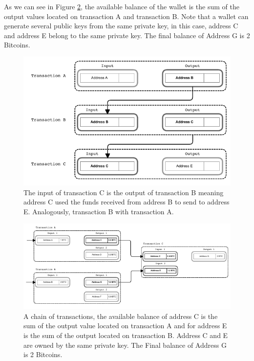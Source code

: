 \documentclass[../../thesis.tex]{subfiles}
\begin{document}
 As we can see in Figure \ref{fig:transactions2}, the available balance of the wallet is the sum of the output values located on transaction A and transaction B. Note that a wallet can generate several public keys from the same private key, in this case, address C and address E belong to the same private key. The final balance of Address G is 2 Bitcoins.
 
\begin{figure}[H]
\centering
\includegraphics[width=\textwidth]{content/bitcoin/img/transactions1}
\caption{The input of transaction C is the output of transaction B meaning address C used the funds received from address B to send to address E. Analogously, transaction B with transaction A.}
\label{fig:transactions1}
\end{figure}



\begin{figure}[H]
\centering
\includegraphics[width=\textwidth]{content/bitcoin/img/transactions2}
\caption{A chain of transactions, the available balance of address C is the sum of the output value located on transaction A and for address E is the sum of the output located on transaction B. Address C and E are owned by the same private key. The Final balance of Address G is 2 Bitcoins.}
\label{fig:transactions2}
\end{figure}
\end{document}
